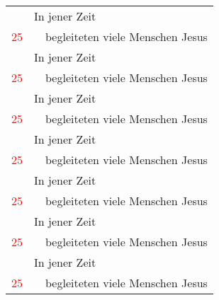 \documentclass[15pt,ngerman]{scrartcl}
\newcommand{\nummer}[1]{\footnotesize\textcolor{red}{#1}}
\begin{document}
\begin{tabular}{cp{1cm}p{8cm}}
& \multicolumn{2}{l}{In jener Zeit} \\
\nummer{25} & & begleiteten viele Menschen Jesus \\
& \multicolumn{2}{l}{In jener Zeit} \\
\nummer{25} & & begleiteten viele Menschen Jesus \\
& \multicolumn{2}{l}{In jener Zeit} \\
\nummer{25} & & begleiteten viele Menschen Jesus \\
& \multicolumn{2}{l}{In jener Zeit} \\
\nummer{25} & & begleiteten viele Menschen Jesus \\
& \multicolumn{2}{l}{In jener Zeit} \\
\nummer{25} & & begleiteten viele Menschen Jesus \\
& \multicolumn{2}{l}{In jener Zeit} \\
\nummer{25} & & begleiteten viele Menschen Jesus \\
& \multicolumn{2}{l}{In jener Zeit} \\
\nummer{25} & & begleiteten viele Menschen Jesus \\
\end{tabular}
\end{document}
